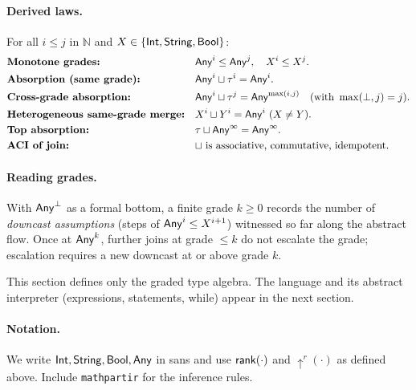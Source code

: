 \paragraph{Derived laws.}
For all $i\le j$ in $\mathbb{N}$ and $X\in\{\mathsf{Int},\mathsf{String},\mathsf{Bool}\}$:
\begin{align*}
&\textbf{Monotone grades:} && \mathsf{Any}^{i} \le \mathsf{Any}^{j},\quad X^{i} \le X^{j}.\\
&\textbf{Absorption (same grade):} && \mathsf{Any}^{i} \sqcup \tau^{i} = \mathsf{Any}^{i}.\\
&\textbf{Cross-grade absorption:} && \mathsf{Any}^{i} \sqcup \tau^{j} = \mathsf{Any}^{\max(i,j)}\quad(\text{with }\max(\bot,j)=j).\\
&\textbf{Heterogeneous same-grade merge:} && X^{i} \sqcup Y^{i}=\mathsf{Any}^{i}\ (X\neq Y).\\
&\textbf{Top absorption:} && \tau \sqcup \mathsf{Any}^{\infty}=\mathsf{Any}^{\infty}.\\
&\textbf{ACI of join:} && \text{$\sqcup$ is associative, commutative, idempotent.}
\end{align*}

\paragraph{Reading grades.}
With $\mathsf{Any}^{\bot}$ as a formal bottom, a finite grade $k\ge 0$ records the number of \emph{downcast assumptions} (steps of $\mathsf{Any}^{i}\le X^{i+1}$) witnessed so far along the abstract flow.
Once at $\mathsf{Any}^{k}$, further joins at grade $\le k$ do not escalate the grade; escalation requires a new downcast at or above grade $k$.

\medskip
This section defines only the graded type algebra.
The language and its abstract interpreter (expressions, statements, \textsf{while}) appear in the next section.

\paragraph*{Notation.}
We write $\mathsf{Int},\mathsf{String},\mathsf{Bool},\mathsf{Any}$ in \textsf{sans} and use
$\mathsf{rank}(\cdot)$ and $\uparrow^{r}(\cdot)$ as defined above.
Include \texttt{mathpartir} for the inference rules.
